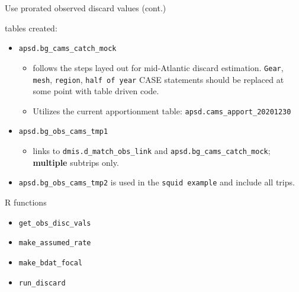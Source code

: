 \documentclass[
  ignorenonframetext,
]{beamer}
\providecommand{\tightlist}{%
  \setlength{\itemsep}{0pt}\setlength{\parskip}{0pt}}
\begin{document}
\begin{frame}[fragile]{Use prorated observed discard values (cont.)}
\protect\hypertarget{use-prorated-observed-discard-values-cont.}{}

tables created:

\begin{itemize}
\tightlist
\item
  \texttt{apsd.bg\_cams\_catch\_mock}

  \begin{itemize}
  \tightlist
  \item
    follows the steps layed out for mid-Atlantic discard estimation.
    \texttt{Gear}, \texttt{mesh}, \texttt{region},
    \texttt{half\ of\ year} CASE statements should be replaced at some
    point with table driven code.\\
  \item
    Utilizes the current apportionment table:
    \texttt{apsd.cams\_apport\_20201230}
  \end{itemize}
\item
  \texttt{apsd.bg\_obs\_cams\_tmp1}

  \begin{itemize}
  \tightlist
  \item
    links to \texttt{dmis.d\_match\_obs\_link} and
    \texttt{apsd.bg\_cams\_catch\_mock}; \textbf{multiple} subtrips
    only. 
  \end{itemize}
\item
  \texttt{apsd.bg\_obs\_cams\_tmp2} is used in the
  \texttt{squid\ example} and include all trips.
\end{itemize}

\end{frame}

\begin{frame}[fragile]{R functions}
\protect\hypertarget{r-functions}{}

\begin{itemize}
\tightlist
\item
  \texttt{get\_obs\_disc\_vals}
\item
  \texttt{make\_assumed\_rate}
\item
  \texttt{make\_bdat\_focal}
\item
  \texttt{run\_discard}
\end{itemize}

\end{frame}
\end{document}
